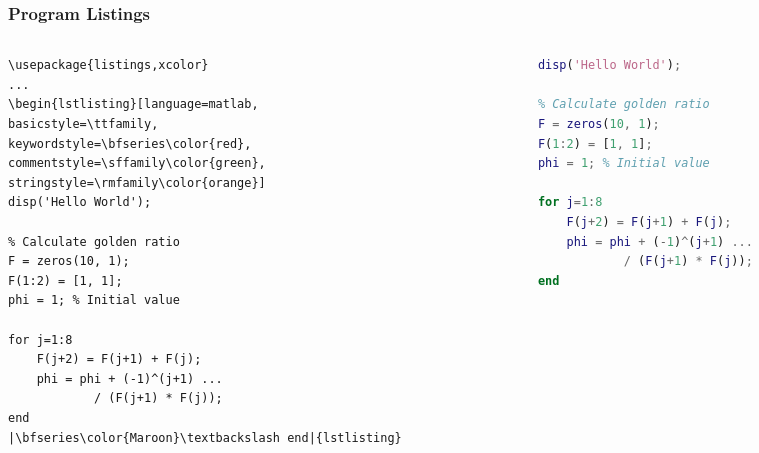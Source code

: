 \begin{frame}[fragile]
\frametitle{Program Listings}

\begin{columns}
\begin{column}{.5\textwidth}
\begin{beamerboxesrounded}{}
\vspace{-1em}
\begin{lstlisting}[basicstyle=\ttfamily\footnotesize,escapechar=|,
emph={listings,lstlisting},moretexcs={color},commentstyle={},]
\usepackage{listings,xcolor}
...
\begin{lstlisting}[language=matlab,
basicstyle=\ttfamily,
keywordstyle=\bfseries\color{red},
commentstyle=\sffamily\color{green},
stringstyle=\rmfamily\color{orange}]
disp('Hello World');

% Calculate golden ratio
F = zeros(10, 1);
F(1:2) = [1, 1];
phi = 1; % Initial value  

for j=1:8
    F(j+2) = F(j+1) + F(j);
    phi = phi + (-1)^(j+1) ...
            / (F(j+1) * F(j));
end
|\bfseries\color{Maroon}\textbackslash end|{lstlisting}
\end{lstlisting}
\vspace{-1em}
\end{beamerboxesrounded}
\end{column}
\hfill\begin{column}{.5\textwidth}
\begin{lstlisting}[language=matlab,escapechar=~,lineskip=-2pt,
basicstyle=\ttfamily,
commentstyle=\upshape\sffamily\small\color{SeaGreen4},keepspaces=true,
keywordstyle=\bfseries\color{Maroon},stringstyle=\rmfamily\color{Sienna2}]
disp('Hello World');

% Calculate golden ratio
F = zeros(10, 1);
F(1:2) = [1, 1];
phi = 1; % Initial value

for j=1:8
    F(j+2) = F(j+1) + F(j);
    phi = phi + (-1)^(j+1) ...
            / (F(j+1) * F(j));
end
\end{lstlisting}
\end{column}
\end{columns}
\end{frame}



